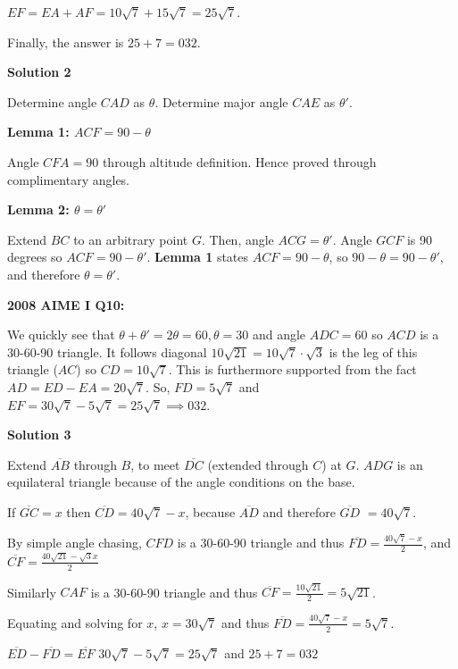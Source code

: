 \begin{enumerate}
 $EF = EA + AF = 10\sqrt {7} + 15\sqrt {7} = 25\sqrt {7}$.

 Finally, the answer is $25+7=\boxed{032}$.

 



\textbf{Solution 2}

Determine angle $CAD$ as $\theta$. Determine major angle $CAE$ as $\theta'$.

 \textbf{Lemma 1: $ACF = 90-\theta$}

 Angle $CFA = 90$ through altitude definition. Hence proved through complimentary angles.

 \textbf{Lemma 2: $\theta = \theta'$}

 Extend $BC$ to an arbitrary point $G$. Then, angle $ACG = \theta'$. Angle $GCF$ is 90 degrees so $ACF = 90-\theta'$. \textbf{Lemma 1} states $ACF = 90-\theta$, so $90-\theta = 90-\theta'$, and therefore $\theta = \theta'$.

 \textbf{2008 AIME I Q10:}

 We quickly see that $\theta + \theta' = 2\theta = 60, \theta = 30$ and angle $ADC = 60$ so $ACD$ is a 30-60-90 triangle. It follows diagonal $10\sqrt{21} = 10\sqrt{7} \cdot \sqrt{3}$ is the leg of this triangle ($AC$) so $CD = 10\sqrt{7}$. This is furthermore supported from the fact $AD = ED-EA = 20\sqrt{7}$. So, $FD = 5\sqrt{7}$ and $EF = 30\sqrt{7} - 5\sqrt{7} = 25\sqrt{7} \implies \boxed{032}$.

 



\textbf{Solution 3}

Extend $\overline {AB}$ through $B$, to meet $\overline {DC}$ (extended through $C$) at $G$. $ADG$ is an equilateral triangle because of the angle conditions on the base.

 If $\overline {GC} = x$ then $\overline {CD} = 40\sqrt{7}-x$, because $\overline{AD}$ and therefore $\overline{GD}$ $= 40\sqrt{7}$.

 By simple angle chasing, $CFD$ is a 30-60-90 triangle and thus $\overline{FD} = \frac{40\sqrt{7}-x}{2}$, and $\overline{CF} = \frac{40\sqrt{21} - \sqrt{3}x}{2}$ 

 Similarly $CAF$ is a 30-60-90 triangle and thus $\overline{CF} = \frac{10\sqrt{21}}{2} = 5\sqrt{21}$.

 Equating and solving for $x$, $x = 30\sqrt{7}$ and thus $\overline{FD} = \frac{40\sqrt{7}-x}{2} = 5\sqrt{7}$.

 $\overline{ED}-\overline{FD} = \overline{EF}$
$30\sqrt{7} - 5\sqrt{7} = 25\sqrt{7}$ and $25 + 7 = \boxed{032}$


\end{enumerate}
